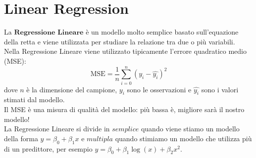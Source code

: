 \section{Linear Regression}
    La $\textbf{Regressione Lineare}$ è un modello molto semplice basato sull'equazione della retta e viene utilizzata per studiare la relazione tra due o più variabili.
    \\[1\baselineskip]
    Nella Regressione Lineare viene utilizzato tipicamente l'errore quadratico medio (MSE):
        $$ \textrm{MSE} = \frac{1}{n} \sum_{i=0}^{n}{\left( y_{i} - \hat{y_{i}} \right)^2} $$
    dove $n$ è la dimensione del campione, $y_{i}$ sono le osservazioni e $\hat{y_{i}}$ sono i valori stimati dal modello.
    \\[1\baselineskip]
    Il MSE è una misura di qualità del modello: più bassa è, migliore sarà il nostro modello!
    \\[1\baselineskip]
    La Regressione Lineare si divide in $\textit{semplice}$ quando viene stiamo un modello della forma $y = \beta_{0} + \beta_{1} x$ e
    $\textit{multipla}$ quando stimiamo un modello che utilizza più di un predittore, per esempio $y = \beta_{0} + \beta_{1} \log(x) + \beta_{2} x^{2}$.

    \clearpage